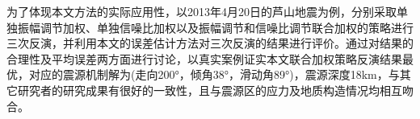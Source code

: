为了体现本文方法的实际应用性，以2013年4月20日的芦山地震为例，分别采取单独振幅调节加权、单独信噪比加权以及振幅调节和信噪比调节联合加权的策略进行三次反演，并利用本文的误差估计方法对三次反演的结果进行评价。通过对结果的合理性及平均误差两方面进行讨论，以真实案例证实本文联合加权策略反演结果最优，对应的震源机制解为(走向200°，倾角38°，滑动角89°)，震源深度18km，与其它研究者的研究成果有很好的一致性，且与震源区的应力及地质构造情况均相互吻合。
